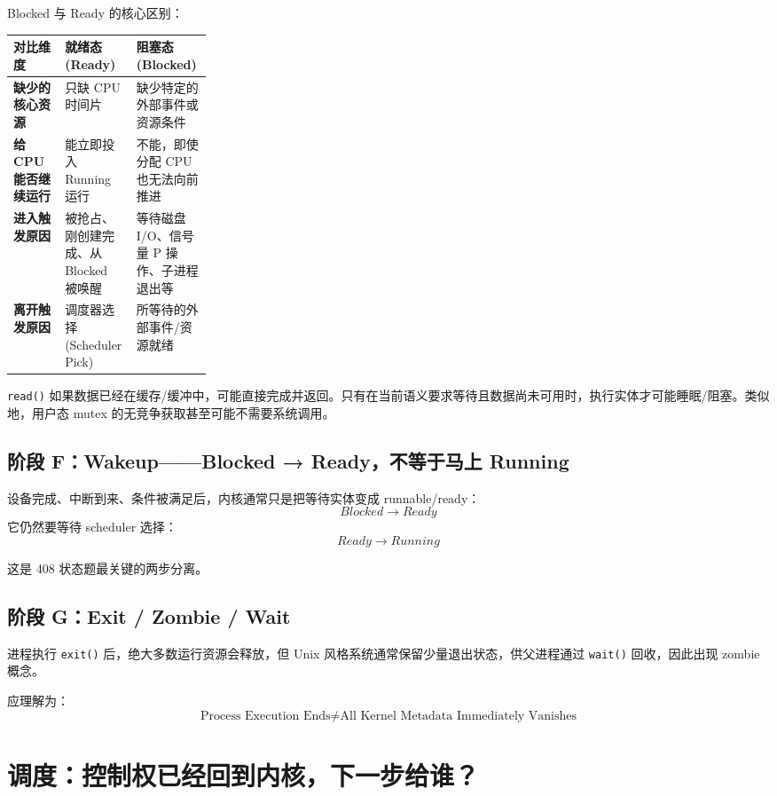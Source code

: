 \documentclass[11pt,a4paper]{ctexart}
\newcommand{\code}[1]{\texttt{#1}}
\begin{document}
Blocked 与 Ready 的核心区别：

\begingroup
\small
\renewcommand{\arraystretch}{1.25}
\setlength{\tabcolsep}{6pt}
\begin{tabularx}{\linewidth}{>{\bfseries}p{0.26\linewidth} X X}
\toprule
对比维度 & 就绪态 (Ready) & 阻塞态 (Blocked)\\
\midrule
缺少的核心资源 & 只缺 CPU 时间片 & 缺少特定的外部事件或资源条件\\
给 CPU 能否继续运行 & 能立即投入 Running 运行 & 不能，即使分配 CPU 也无法向前推进\\
进入触发原因 & 被抢占、刚创建完成、从 Blocked 被唤醒 & 等待磁盘 I/O、信号量 P 操作、子进程退出等\\
离开触发原因 & 调度器选择 (Scheduler Pick) & 所等待的外部事件/资源就绪\\
\bottomrule
\end{tabularx}
\endgroup

\begin{warn}
\code{read()} 如果数据已经在缓存/缓冲中，可能直接完成并返回。只有在当前语义要求等待且数据尚未可用时，执行实体才可能睡眠/阻塞。类似地，用户态 mutex 的无竞争获取甚至可能不需要系统调用。
\end{warn}

\subsection{阶段 F：Wakeup——Blocked → Ready，不等于马上 Running}

设备完成、中断到来、条件被满足后，内核通常只是把等待实体变成 runnable/ready：
\[
\boxed{Blocked\rightarrow Ready}
\]
它仍然要等待 scheduler 选择：
\[
\boxed{Ready\rightarrow Running}
\]

这是 408 状态题最关键的两步分离。

\subsection{阶段 G：Exit / Zombie / Wait}

进程执行 \code{exit()} 后，绝大多数运行资源会释放，但 Unix 风格系统通常保留少量退出状态，供父进程通过 \code{wait()} 回收，因此出现 zombie 概念。

应理解为：
\[
\text{Process Execution Ends}\neq\text{All Kernel Metadata Immediately Vanishes}
\]

\section{调度：控制权已经回到内核，下一步给谁？}
\end{document}
